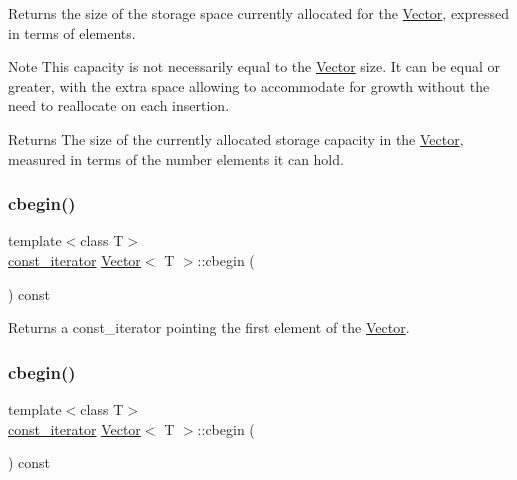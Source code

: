 Returns the size of the storage space currently allocated for the \hyperlink{classVector}{Vector}, expressed in terms of elements. 

\begin{DoxyNote}{Note}
This capacity is not necessarily equal to the \hyperlink{classVector}{Vector} size. It can be equal or greater, with the extra space allowing to accommodate for growth without the need to reallocate on each insertion. 
\end{DoxyNote}
\begin{DoxyReturn}{Returns}
The size of the currently allocated storage capacity in the \hyperlink{classVector}{Vector}, measured in terms of the number elements it can hold. 
\end{DoxyReturn}
\mbox{\label{classVector_afa15b0e58a9d29293941b3741a2ed1b5}} 
\subsubsection{\texorpdfstring{cbegin()}{cbegin()}\hspace{0.1cm}{\footnotesize\ttfamily [1/2]}}
{\footnotesize\ttfamily template$<$class T$>$ \\
\hyperlink{classVector_a484e934cc06bb84c7d70042e792b6e55}{const\+\_\+iterator} \hyperlink{classVector}{Vector}$<$ T $>$\+::cbegin (\begin{DoxyParamCaption}{ }\end{DoxyParamCaption}) const\hspace{0.3cm}{\ttfamily [inline]}}

Returns a const\+\_\+iterator pointing the first element of the \hyperlink{classVector}{Vector}. \mbox{\label{classVector_afa15b0e58a9d29293941b3741a2ed1b5}} 
\subsubsection{\texorpdfstring{cbegin()}{cbegin()}\hspace{0.1cm}{\footnotesize\ttfamily [2/2]}}
{\footnotesize\ttfamily template$<$class T$>$ \\
\hyperlink{classVector_a484e934cc06bb84c7d70042e792b6e55}{const\+\_\+iterator} \hyperlink{classVector}{Vector}$<$ T $>$\+::cbegin (\begin{DoxyParamCaption}{ }\end{DoxyParamCaption}) const\hspace{0.3cm}{\ttfamily [inline]}}

